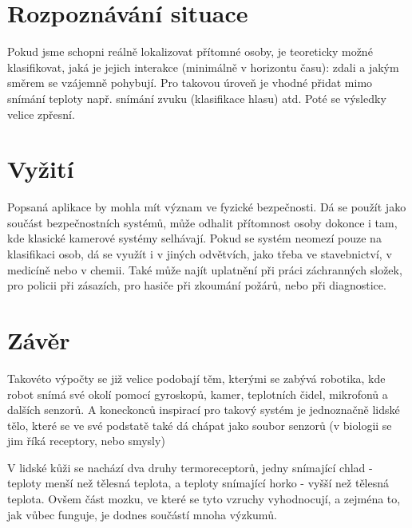 \documentclass[10pt,a4paper,titlepage]{article}
\begin{document}
  \section{Rozpoznávání situace}
  Pokud jsme schopni reálně lokalizovat přítomné osoby, je teoreticky možné klasifikovat, jaká je jejich
  interakce (minimálně v horizontu času): zdali a jakým směrem se vzájemně pohybují. Pro takovou
  úroveň je vhodné přidat mimo snímání teploty např. snímání zvuku (klasifikace hlasu) atd.
  Poté se výsledky velice zpřesní.
  
  \section{Vyžití}
  Popsaná aplikace by mohla mít význam ve fyzické bezpečnosti. Dá se použít jako součást
  bezpečnostních systémů, může odhalit přítomnost osoby dokonce i tam, kde klasické kamerové
  systémy selhávají. Pokud se systém neomezí pouze na klasifikaci osob, dá se využít i v jiných
  odvětvích, jako třeba ve stavebnictví, v medicíně nebo v chemii. Také může najít uplatnění
  při práci záchranných složek, pro policii při zásazích, pro hasiče při zkoumání požárů,
  nebo při diagnostice.

  \section{Závěr}
  Takovéto výpočty se již velice podobají těm, kterými se zabývá robotika, kde robot snímá své
  okolí pomocí gyroskopů, kamer, teplotních čidel, mikrofonů a dalších senzorů. A koneckonců inspirací
  pro takový systém je jednoznačně lidské tělo, které se ve své podstatě také dá chápat jako soubor
  senzorů (v biologii se jim říká receptory, nebo smysly)
  
  V lidské kůži se nachází dva druhy termoreceptorů, jedny snímající chlad - teploty menší než
  tělesná teplota, a teploty snímající horko - vyšší než tělesná teplota. Ovšem část mozku,
  ve které se tyto vzruchy vyhodnocují, a zejména to, jak vůbec funguje, je dodnes součástí mnoha
  výzkumů.\cite{BodilySenses}

  \newpage
  \printbibliography
\end{document}
